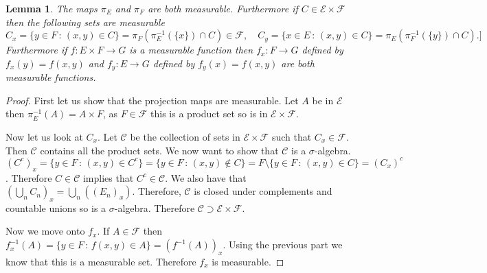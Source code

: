 \documentclass[11pt]{article}
\newtheorem{lem}[thm]{Lemma}
\theoremstyle{definition}
\theoremstyle{remark}
\begin{document}
\begin{lem}
The maps $\pi_E$ and $\pi_F$ are both measurable. Furthermore if $C \in \mathcal{E} \times \mathcal{F}$ then the following sets are measurable
\[ C_x = \{ y \in F \,:\, (x,y) \in C \} = \pi_F\left(\pi_E^{-1}(\{x\}) \cap C\right) \in \mathcal{F} , \quad C_y = \{ x \in E \,:\, (x,y) \in C\} = \pi_E \left( \pi_F^{-1}(\{y\}) \cap C \right). ] \]
Furthermore if $f: E \times F \rightarrow G$ is a measurable function then $f_x: F \rightarrow G$ defined by $f_x(y) = f(x,y)$ and $f_y: E \rightarrow G$ defined by $f_y(x) = f(x,y)$ are both measurable functions. 
\end{lem}
\begin{proof}
First let us show that the projection maps are measurable. Let $A$ be in $\mathcal{E}$ then $\pi_E^{-1}(A) = A \times F$, as $F \in \mathcal{F}$ this is a product set so is in $\mathcal{E} \times \mathcal{F}$.

Now let us look at $C_x$. Let $\mathcal{C}$ be the collection of sets in $\mathcal{E} \times \mathcal{F}$ such that $C_x \in \mathcal{F}$. Then $\mathcal{C}$ contains all the product sets. We now want to show that $\mathcal{C}$ is a $\sigma$-algebra. $(C^c)_x = \{ y \in F \,:\, (x,y) \in C^c\} = \{ y \in F \, :\, (x,y) \notin C\}  = F \setminus \{ y \in F\,:\, (x,y) \in C\} = (C_x)^c$. Therefore $C \in \mathcal{C}$ implies that $C^c \in \mathcal{C}$. We also have that $\left(\bigcup_n C_n \right)_x = \bigcup_n \left( (E_n)_x \right)$. Therefore, $\mathcal{C}$ is closed under complements and countable unions so is a $\sigma$-algebra. Therefore $\mathcal{C} \supset \mathcal{E} \times \mathcal{F}$.

Now we move onto $f_x$. If $A \in \mathcal{F}$ then $f_x^{-1}(A) = \{ y \in F \,:\, f(x,y) \in A\} = (f^{-1}(A))_x$. Using the previous part we know that this is a measurable set. Therefore $f_x$ is measurable.
\end{proof}
\end{document}
